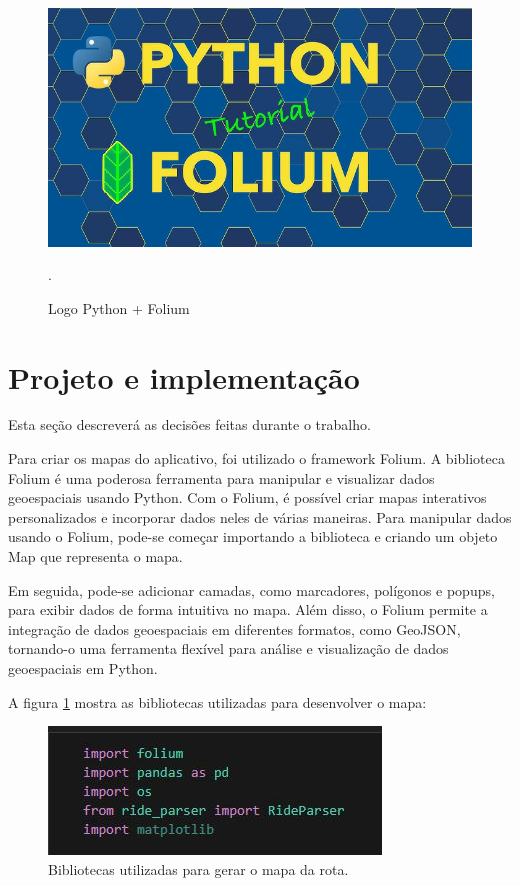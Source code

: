       \begin{figure}[hp]
    \centering
    
    \includegraphics[scale=0.1]{figures/python_folium.jpg}
    
    \caption{Logo Python + Folium }.  
\end{figure}



\section{Projeto e implementação}
Esta seção descreverá as decisões feitas durante o trabalho.

Para criar os mapas do aplicativo, foi utilizado o framework Folium. A biblioteca Folium é uma poderosa ferramenta para manipular e visualizar dados geoespaciais usando Python. Com o Folium, é possível criar mapas interativos personalizados e incorporar dados neles de várias maneiras. Para manipular dados usando o Folium, pode-se começar importando a biblioteca e criando um objeto Map que representa o mapa. 

Em seguida, pode-se adicionar camadas, como marcadores, polígonos e popups, para exibir dados de forma intuitiva no mapa. Além disso, o Folium permite a integração de dados geoespaciais em diferentes formatos, como GeoJSON, tornando-o uma ferramenta flexível para análise e visualização de dados geoespaciais em Python.

A figura \ref{fig:python_libs} mostra as bibliotecas utilizadas para desenvolver o mapa:

\begin{figure}[hp]
    \centering
    
    \includegraphics[scale=0.8]{figures/bibliotecas.jpg}
    
    \caption{Bibliotecas utilizadas para gerar o mapa da rota.}
    
    \label{fig:python_libs}
\end{figure}

